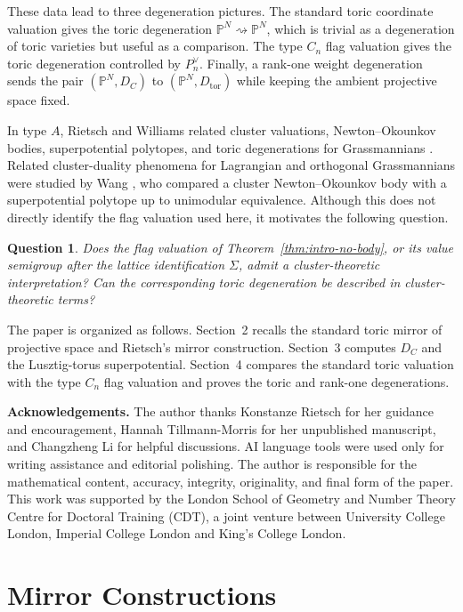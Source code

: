\documentclass{article}
\newtheorem*{ques}{Question}
\newcommand{\PP}{\mathbb{P}}
\begin{document}
These data lead to three degeneration pictures. The standard toric coordinate valuation gives the toric degeneration \(\PP^N\rightsquigarrow \PP^N\), which is trivial as a degeneration of toric varieties but useful as a comparison. The type \(C_n\) flag valuation gives the toric degeneration controlled by \(P_n^\vee\). Finally, a rank-one weight degeneration sends the pair \((\PP^N,D_C)\) to \((\PP^N,D_{\mathrm{tor}})\) while keeping the ambient projective space fixed.

In type \(A\), Rietsch and Williams related cluster valuations, Newton--Okounkov bodies, superpotential polytopes, and toric degenerations for Grassmannians \cite{RW}. Related cluster-duality phenomena for Lagrangian and orthogonal Grassmannians were studied by Wang \cite{clusterC}, who compared a cluster Newton--Okounkov body with a superpotential polytope up to unimodular equivalence. Although this does not directly identify the flag valuation used here, it motivates the following question.

\begin{ques}
Does the flag valuation of Theorem~\ref{thm:intro-no-body}, or its value semigroup after the lattice identification \(\Sigma\), admit a cluster-theoretic interpretation? Can the corresponding toric degeneration be described in cluster-theoretic terms?
\end{ques}

The paper is organized as follows. Section~2 recalls the standard toric mirror of projective space and Rietsch's mirror construction. Section~3 computes \(D_C\) and the Lusztig-torus superpotential. Section~4 compares the standard toric valuation with the type \(C_n\) flag valuation and proves the toric and rank-one degenerations.

{\small\noindent\textbf{Acknowledgements.} The author thanks Konstanze Rietsch for her guidance and encouragement, Hannah Tillmann-Morris for her unpublished manuscript, and Changzheng Li for helpful discussions. AI language tools were used only for writing assistance and editorial polishing. The author is responsible for the mathematical content, accuracy, integrity, originality, and final form of the paper. This work was supported by the London School of Geometry and Number Theory Centre for Doctoral Training (CDT), a joint venture between University College London, Imperial College London and King's College London.}

\section{Mirror Constructions}
\end{document}

